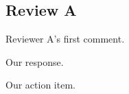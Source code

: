 
\setcounter{section}{1}

\subsection*{Review A}

\begin{reviewitem}[label={A1}]
Reviewer A's first comment.
\end{reviewitem}

\begin{response}
Our response.
\end{response}

\begin{action}
Our action item.
\end{action}

